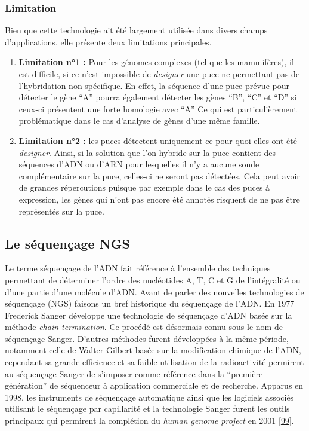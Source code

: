 \documentclass[12pt,twoside]{ugathesis}
\theoremstyle{definition}
\theoremstyle{definition}
\theoremstyle{remark}
\begin{document}
\subsubsection{Limitation}\label{limitation}

Bien que cette technologie ait été largement utilisée dans divers champs
d'applications, elle présente deux limitations principales.

\begin{enumerate}
\def\labelenumi{\arabic{enumi}.}
\item
  \textbf{Limitation n°1 :} Pour les génomes complexes (tel que les
  mammifères), il est difficile, si ce n'est impossible de
  \emph{designer} une puce ne permettant pas de l'hybridation non
  spécifique. En effet, la séquence d'une puce prévue pour détecter le
  gène ``A'' pourra également détecter les gènes ``B'', ``C'' et ``D''
  si ceux-ci présentent une forte homologie avec ``A'' Ce qui est
  particulièrement problématique dans le cas d'analyse de gènes d'une
  même famille.
\item
  \textbf{Limitation n°2 :} les puces détectent uniquement ce pour quoi
  elles ont été \emph{designer}. Ainsi, si la solution que l'on hybride
  sur la puce contient des séquences d'ADN ou d'ARN pour lesquelles il
  n'y a aucune sonde complémentaire sur la puce, celles-ci ne seront pas
  détectées. Cela peut avoir de grandes répercutions puisque par exemple
  dans le cas des puces à expression, les gènes qui n'ont pas encore été
  annotés risquent de ne pas être représentés sur la puce.
\end{enumerate}

\newpage

\hypertarget{ngs}{\subsection{Le séquençage NGS}\label{ngs}}

Le terme séquençage de l'ADN fait référence à l'ensemble des techniques
permettant de déterminer l'ordre des nucléotides A, T, C et G de
l'intégralité ou d'une partie d'une molécule d'ADN. Avant de parler des
nouvelles technologies de séquençage (NGS) faisons un bref historique du
séquençage de l'ADN. En 1977 Frederick Sanger développe une technologie
de séquençage d'ADN basée sur la méthode \emph{chain-termination}. Ce
procédé est désormais connu sous le nom de séquençage Sanger. D'autres
méthodes furent développées à la même période, notamment celle de Walter
Gilbert basée sur la modification chimique de l'ADN, cependant sa grande
efficience et sa faible utilisation de la radioactivité permirent au
séquençage Sanger de s'imposer comme référence dans la ``première
génération'' de séquenceur à application commerciale et de recherche.
Apparus en 1998, les instruments de séquençage automatique ainsi que les
logiciels associés utilisant le séquençage par capillarité et la
technologie Sanger furent les outils principaux qui permirent la
complétion du \emph{human genome project} en 2001
{[}\protect\hyperlink{ref-Collins2003}{99}{]}.
\end{document}
